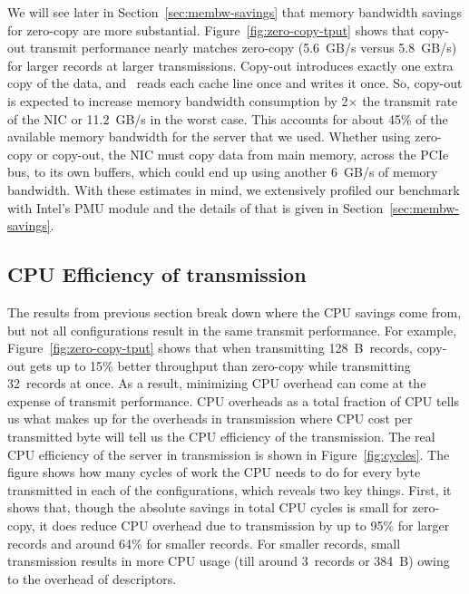 We will see later in Section~\ref{sec:membw-savings} that memory bandwidth savings for zero-copy are more substantial.
Figure~\ref{fig:zero-copy-tput} shows that copy-out transmit performance nearly
matches zero-copy (5.6~GB/s versus 5.8~GB/s) for larger records at larger transmissions. Copy-out introduces exactly one
extra copy of the data, and \memcpy~reads each cache line once and writes it
once. So, copy-out is expected to increase memory bandwidth consumption
by 2$\times$ the transmit rate of the NIC or 11.2~GB/s in the worst case.  This
accounts for about 45\% of the available memory bandwidth for the server that we used. Whether
using zero-copy or copy-out, the NIC must copy data from main memory, across the PCIe bus, to its own buffers, which
could end up using another 6~GB/s of memory bandwidth. With these estimates in mind, we extensively profiled
 our benchmark with Intel's PMU module and the details of that is given in Section~\ref{sec:membw-savings}.





\subsection {CPU Efficiency of transmission}
The results from previous section break down where the CPU savings come from,
but not all configurations result in the same transmit performance. For
example, Figure~\ref{fig:zero-copy-tput} shows that when transmitting
128~B~records, copy-out gets up to 15\% better throughput than zero-copy while transmitting
32~records at once. As a result, minimizing CPU overhead can come at the expense of transmit
performance. CPU overheads as a total fraction of CPU tells us what makes up for the overheads 
in transmission where CPU cost per transmitted byte will tell us the CPU efficiency of the 
transmission. The real CPU efficiency of the server in transmission is shown in
Figure~\ref{fig:cycles}. The figure shows how many cycles of work the CPU needs to do
for every byte transmitted in each of the configurations, which reveals two key things.
First, it shows that, though the absolute savings in total CPU cycles is small
for zero-copy, it does reduce CPU overhead due to transmission by up to 95\% for 
larger records and around 64\% for smaller records. For smaller records, small transmission
results in more CPU usage (till around 3~records or 384~B) owing to the overhead of descriptors.



